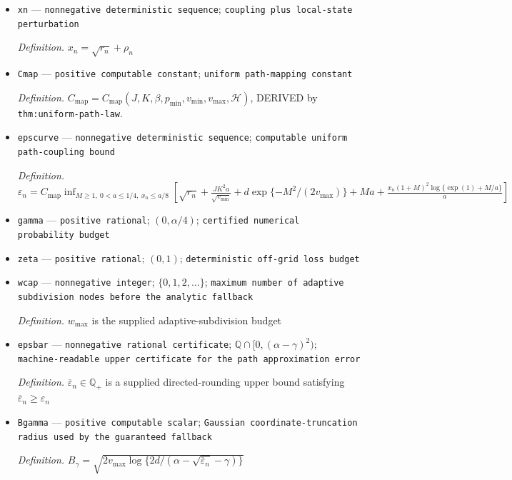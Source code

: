 \documentclass{article}
\begin{document}
\begin{itemize}
  \item \texttt{xn} --- \texttt{nonnegative deterministic sequence}; \texttt{coupling plus local-\allowbreak{}state perturbation}
  \par\smallskip\noindent\emph{Definition.} \(x_n=\sqrt{r_n}+\rho_n\)
  \item \texttt{Cmap} --- \texttt{positive computable constant}; \texttt{uniform path-\allowbreak{}mapping constant}
  \par\smallskip\noindent\emph{Definition.} \(C_{\mathrm{map}}=C_{\mathrm{map}}(J,K,\beta,p_{\min},v_{\min},v_{\max},\mathcal H)\), DERIVED by \texttt{thm:uniform-path-law}.
  \item \texttt{epscurve} --- \texttt{nonnegative deterministic sequence}; \texttt{computable uniform path-\allowbreak{}coupling bound}
  \par\smallskip\noindent\emph{Definition.} \(\varepsilon_n=C_{\mathrm{map}}\inf_{M\ge1,\ 0<a\le1/4,\ x_n\le a/8}\left[\sqrt{r_n}+\frac{JK^2a}{\sqrt{v_{\min}}}+d\exp\{-M^2/(2v_{\max})\}+Ma+\frac{x_n(1+M)^2\log\{\exp(1)+M/a\}}{a}\right]\)
  \item \texttt{gamma} --- \texttt{positive rational}; \((0,\alpha/4)\); \texttt{certified numerical probability budget}
  \item \texttt{zeta} --- \texttt{positive rational}; \((0,1)\); \texttt{deterministic off-\allowbreak{}grid loss budget}
  \item \texttt{wcap} --- \texttt{nonnegative integer}; \(\{0,1,2,\ldots\}\); \texttt{maximum number of adaptive subdivision nodes before the analytic fallback}
  \par\smallskip\noindent\emph{Definition.} \(w_{\max}\) is the supplied adaptive-subdivision budget
  \item \texttt{epsbar} --- \texttt{nonnegative rational certificate}; \(\mathbb Q\cap[0,(\alpha-\gamma)^2)\); \texttt{machine-\allowbreak{}readable upper certificate for the path approximation error}
  \par\smallskip\noindent\emph{Definition.} \(\overline\varepsilon_n\in\mathbb Q_+\) is a supplied directed-rounding upper bound satisfying \(\overline\varepsilon_n\ge\varepsilon_n\)
  \item \texttt{Bgamma} --- \texttt{positive computable scalar}; \texttt{Gaussian coordinate-\allowbreak{}truncation radius used by the guaranteed fallback}
  \par\smallskip\noindent\emph{Definition.} \(B_\gamma=\sqrt{2v_{\max}\log\{2d/(\alpha-\sqrt{\overline\varepsilon_n}-\gamma)\}}\)

\end{itemize}
\end{document}
